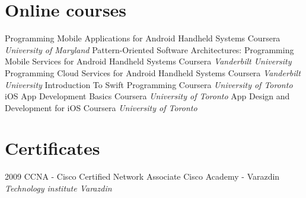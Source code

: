 \documentclass[print]{cv}
\begin{document}
\section{Online courses}
\begin{entrylist}
	\entry
	{} 
	{Programming Mobile Applications for Android Handheld Systems}
	{Coursera}
	{\emph{University of Maryland}}
	\entry
	{}
	{Pattern-Oriented Software Architectures: Programming Mobile Services for Android Handheld Systems}
	{Coursera}
	{\emph{Vanderbilt University}}
	\entry
	{}
	{Programming Cloud Services for Android Handheld Systems} 
	{Coursera}
	{\emph{Vanderbilt University}}
	\entry
	{} 
	{Introduction To Swift Programming}
	{Coursera}
	{\emph{University of Toronto}}
	\entry
	{}
	{iOS App Development Basics}
	{Coursera}
	{\emph{University of Toronto}}
	\entry
	{}
	{App Design and Development for iOS} 
	{Coursera}
	{\emph{University of Toronto}}
\end{entrylist}



\section{Certificates}
\begin{entrylist}
	\entry
	{2009} 
	{CCNA - Cisco Certified Network Associate}
	{Cisco Academy - Varazdin}
	{\emph{Technology institute Varazdin}}
\end{entrylist}
\end{document}
